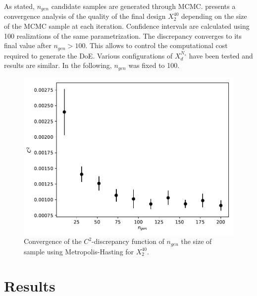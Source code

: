 As stated, $n_{gen}$ candidate samples are generated through MCMC.  presents a convergence analysis of the quality of the final design $X_2^{40}$ depending on the size of the MCMC sample at each iteration. Confidence intervals are calculated using 100 realizations of the same parametrization. The discrepancy converges to its final value after $n_{gen}>100$. This allows to control the computational cost required to generate the DoE. Various configurations of $X_d^{N_s}$ have been tested and results are similar. In the following, $n_{gen}$ was fixed to 100.

\begin{figure}[!ht]
\centering
\includegraphics[width=0.8\linewidth,keepaspectratio]{fig/contributions/doe/conv_C2-Ngen-Kdoe2-40.pdf}
\caption{Convergence of the $C^2$-discrepancy function of $n_{gen}$ the size of sample using Metropolis-Hasting for $X_2^{40}$.}
\label{fig:conv-ngen}
\end{figure}





\section{Results}%

